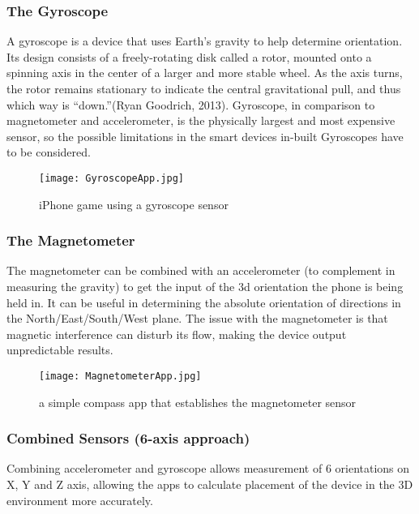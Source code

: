 \subsubsection*{The Gyroscope}
A gyroscope is a device that uses Earth’s gravity to help determine orientation. Its design consists of a freely-rotating disk called a rotor, mounted onto a spinning axis in the center of a larger and more stable wheel. As the axis turns, the rotor remains stationary to indicate the central gravitational pull, and thus which way is “down.”(Ryan Goodrich, 2013). Gyroscope, in comparison to magnetometer and accelerometer, is the physically largest and most expensive sensor, so the possible limitations in the smart devices in-built Gyroscopes have to be considered.

\begin{figure}[H]
\centering
\texttt{[image: GyroscopeApp.jpg]}
\caption{iPhone game using a gyroscope sensor}
\end{figure}

\subsubsection*{The Magnetometer}
The magnetometer can be combined with an accelerometer (to complement in measuring the gravity) to get the input of the 3d orientation the phone is being held in. It can be useful in determining the absolute orientation of directions in the North/East/South/West plane. The issue with the magnetometer is that magnetic interference can disturb its flow, making the device output unpredictable results.

\begin{figure}[H]
\centering
\texttt{[image: MagnetometerApp.jpg]}
\caption{a simple compass app that establishes the magnetometer sensor}
\end{figure}

\subsubsection*{Combined Sensors (6-axis approach)}
Combining accelerometer and gyroscope allows measurement of 6 orientations on X, Y and Z axis, allowing the apps to calculate placement of the device in the 3D environment more accurately.
